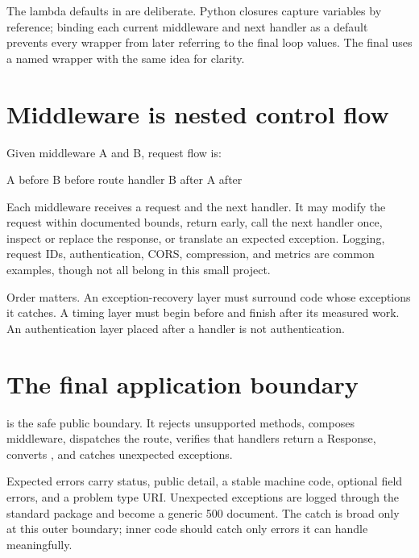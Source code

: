
The lambda defaults in  are deliberate. Python closures capture
variables by reference; binding each current middleware and next handler as a
default prevents every wrapper from later referring to the final loop values.
The final  uses a named wrapper with the same idea for clarity.

\section{Middleware is nested control flow}

Given middleware A and B, request flow is:

\begin{wiremessage}
A before
  B before
    route handler
  B after
A after
\end{wiremessage}

Each middleware receives a request and the next handler. It may modify the request
within documented bounds, return early, call the next handler once, inspect or
replace the response, or translate an expected exception. Logging, request IDs,
authentication, CORS, compression, and metrics are common examples, though not
all belong in this small project.

Order matters. An exception-recovery layer must surround code whose exceptions
it catches. A timing layer must begin before and finish after its measured work.
An authentication layer placed after a handler is not authentication.

\section{The final application boundary}


 is the safe public boundary. It rejects unsupported
methods, composes middleware, dispatches the route, verifies that handlers return
a Response, converts , and catches unexpected exceptions.

Expected errors carry status, public detail, a stable machine code, optional
field errors, and a problem type URI. Unexpected exceptions are logged through
the standard  package and become a generic 500 document. The catch
is broad only at this outer boundary; inner code should catch only errors it can
handle meaningfully.

